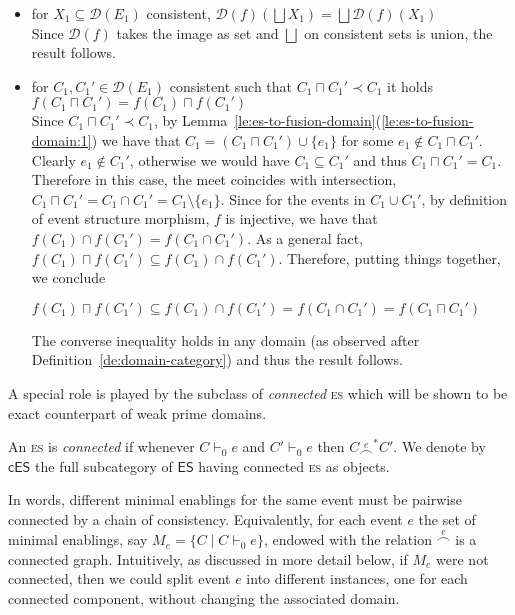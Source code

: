 \documentclass[conference]{IEEEtran}
\renewenvironment{proof}{\begin{IEEEproof}}{\end{IEEEproof}}
\newcommand{\esabbr}{\textsc{es}}
\newcommand{\es}{\ensuremath{\mathsf{ES}}}
\newcommand{\ces}{\ensuremath{\mathsf{cES}}}
\newcommand{\conn}[1]{\ensuremath{\stackrel{#1}{\frown}}}
\newcommand{\zdom}[0]{\ensuremath{\mathcal{D}}}
\newcommand{\dom}[1]{\ensuremath{\zdom({#1})}}
\begin{document}
\begin{proof}
\begin{itemize}
  \item for $X_1 \subseteq \dom{{E}_1}$ consistent, $\dom{f}(\bigsqcup X_1) = \bigsqcup \dom{f}(X_1)$\\
    Since $\dom{f}$ takes the image as set and $\bigsqcup$ on
    consistent sets is union, the result follows.\\

  \item for $C_1, C_1' \in \dom{{E}_1}$ consistent such that
    $C_1 \sqcap C_1' \prec C_1$ it holds
    $f(C_1 \sqcap C_1') = f(C_1) \sqcap f(C_1')$\\
    Since $C_1 \sqcap C_1' \prec C_1$, by
      Lemma~\ref{le:es-to-fusion-domain}(\ref{le:es-to-fusion-domain:1})
      we have that $C_ 1 = (C_1 \sqcap C_1') \cup \{ e_1 \}$ for some
      $e_1 \not\in C_1 \sqcap C_1'$.
    Clearly $e_1 \not\in C_1'$, otherwise we would have $C_1 \subseteq C_1'$
    and thus $C_1 \sqcap C_1' = C_1$. Therefore in this case, the meet
    coincides with intersection,
    $C_1 \sqcap C_1' = C_1 \cap C_1' = C_1 \setminus \{ e_1 \}$.
    Since for the events in $C_1 \cup C_1'$, by definition of event
    structure morphism, $f$ is injective, we have that
    $f(C_1) \cap f(C_1') = f(C_1 \cap C_1')$.
    As a general fact,
    $f(C_1) \sqcap f(C_1') \subseteq f(C_1) \cap f(C_1')$. Therefore,
    putting things together, we conclude
    \begin{center}
      $f(C_1) \sqcap f(C_1') \subseteq f(C_1) \cap f(C_1') = f(C_1
      \cap C_1') = f(C_1 \sqcap C_1')$
    \end{center}
    The converse inequality holds in any domain (as observed after
    Definition~\ref{de:domain-category}) and thus the result follows.
  \end{itemize}
\end{proof}


A special role is played by the subclass of \emph{connected} {\esabbr}
which will be shown to be exact counterpart of weak prime domains.


\begin{definition}
  \label{de:connected-es}
  An {\esabbr} is \emph{connected} if whenever
  $C \vdash_0 e$ and $C' \vdash_0 e$ then $C \conn{e}^* C'$.  We
  denote by $\ces$ the full subcategory of $\es$ having connected {\esabbr}
  as objects.
\end{definition}

In words, different minimal enablings for the same event must be
pairwise connected by a chain of consistency. Equivalently, for each
event $e$ the set of minimal enablings, say
$M_e = \{ C \mid C \vdash_0 e \}$, endowed with the relation
$\conn{e}$ is a connected graph. Intuitively, as discussed in more
detail below, if $M_e$ were not connected, then we could split event
$e$ into different instances, one for each connected component,
without changing the associated domain.
\end{document}
